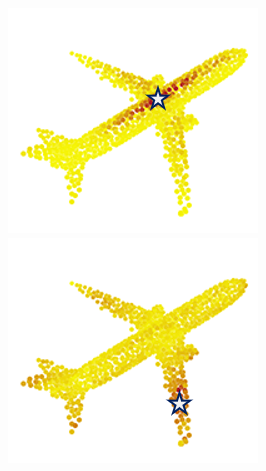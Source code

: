 \documentclass[letterpaper]{article}
\begin{document}
\begin{figure}[htbp]
\begin{center}
\begin{minipage}[b]{0.8\linewidth}
\begin{center}
\begin{minipage}[b]{0.12\linewidth}
\begin{center}
\includegraphics[width=1.0\linewidth]{images/atten_pic/airplane_feature_2.png}
\end{center}
\end{minipage}
\begin{minipage}[b]{0.12\linewidth}
\begin{center}
\includegraphics[width=1.0\linewidth]{images/atten_pic/airplane_feature_3.png}
\end{center}

\end{minipage}
\end{center}
\end{minipage}
\end{center}
\end{figure}
\end{document}
